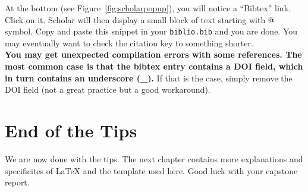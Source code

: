 At the bottom (see Figure~\ref{fig:scholarpopup}), you will notice a ``Bibtex'' link. Click on it.
Scholar will then display a small block of text starting with @ symbol.
Copy and paste this snippet in your \texttt{biblio.bib} and you are done.
You may eventually want to check the citation key to something shorter.
\\

\textbf{You may get unexpected compilation errors with some references. The most common case is that the bibtex entry contains a DOI field, which in turn contains an underscore (\_).}
If that is the case, simply remove the DOI field (not a great practice but a good workaround).

\section{End of the Tips}
We are now done with the tips.
The next chapter contains more explanations and specificites of LaTeX{} and the template used here.
Good luck with your capstone report.

